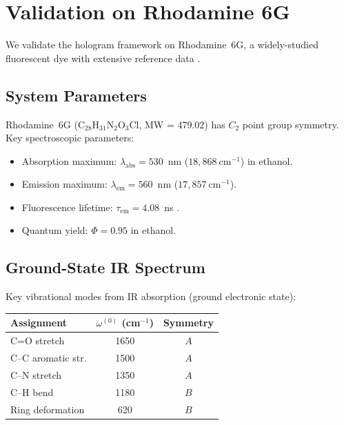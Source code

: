\documentclass[11pt,twocolumn,a4paper]{article}
\theoremstyle{definition}
\theoremstyle{remark}
\begin{document}
\section{Validation on Rhodamine 6G}
\label{sec:rhodamine}

We validate the hologram framework on Rhodamine~6G, a widely-studied fluorescent dye with extensive reference data \citep{kubin1982, magde1999}.

\subsection{System Parameters}

Rhodamine~6G (C$_{28}$H$_{31}$N$_2$O$_3$Cl, MW = 479.02) has $C_2$ point group symmetry. Key spectroscopic parameters:
\begin{itemize}
  \item Absorption maximum: $\lambda_{\mathrm{abs}} = 530$~nm ($18{,}868~\mathrm{cm}^{-1}$) in ethanol.
  \item Emission maximum: $\lambda_{\mathrm{em}} = 560$~nm ($17{,}857~\mathrm{cm}^{-1}$).
  \item Fluorescence lifetime: $\tau_{\mathrm{em}} = 4.08$~ns \citep{magde1999}.
  \item Quantum yield: $\Phi = 0.95$ in ethanol.
\end{itemize}

\subsection{Ground-State IR Spectrum}

Key vibrational modes from IR absorption (ground electronic state):
\begin{center}
\begin{tabular}{lcc}
\toprule
Assignment & $\omega^{(0)}$ (cm$^{-1}$) & Symmetry \\
\midrule
C=O stretch       & 1650 & $A$ \\
C--C aromatic str. & 1500 & $A$ \\
C--N stretch       & 1350 & $A$ \\
C--H bend          & 1180 & $B$ \\
Ring deformation   & 620  & $B$ \\
\bottomrule
\end{tabular}
\end{center}
\end{document}
